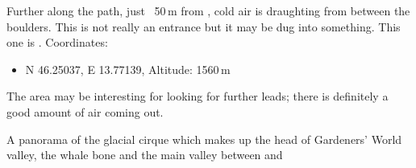 Further along the path, just ~50\,m from , cold air is draughting from between the boulders. This is not really an entrance but it may be dug into something. This one is . Coordinates:

\begin{itemize}
	\item N 46.25037, E 13.77139,  Altitude: 1560\,m
\end{itemize}

The area may be interesting for looking for further leads; there is definitely a good amount of air coming out.


\begin{pagefigure}
      \checkoddpage \ifoddpage \forcerectofloat \else \forceversofloat \fi
      \centering
       \label{Panorama}
  \caption{ A  panorama of the glacial cirque which makes up the head of Gardeners' World valley, the whale bone and the main valley between  and  }
\end{pagefigure}
